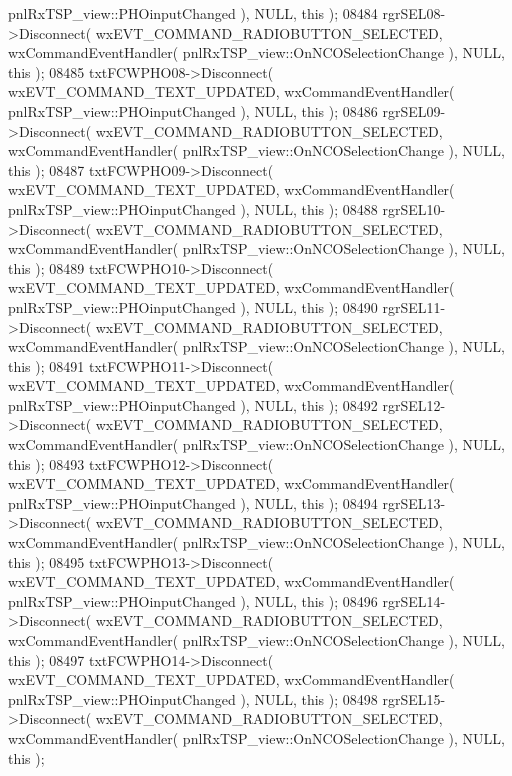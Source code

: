 \begin{DoxyCode}
      pnlRxTSP_view::PHOinputChanged ), NULL, \textcolor{keyword}{this} );
08484     rgrSEL08->Disconnect( wxEVT\_COMMAND\_RADIOBUTTON\_SELECTED, wxCommandEventHandler( 
      pnlRxTSP_view::OnNCOSelectionChange ), NULL, \textcolor{keyword}{this} );
08485     txtFCWPHO08->Disconnect( wxEVT\_COMMAND\_TEXT\_UPDATED, wxCommandEventHandler( 
      pnlRxTSP_view::PHOinputChanged ), NULL, \textcolor{keyword}{this} );
08486     rgrSEL09->Disconnect( wxEVT\_COMMAND\_RADIOBUTTON\_SELECTED, wxCommandEventHandler( 
      pnlRxTSP_view::OnNCOSelectionChange ), NULL, \textcolor{keyword}{this} );
08487     txtFCWPHO09->Disconnect( wxEVT\_COMMAND\_TEXT\_UPDATED, wxCommandEventHandler( 
      pnlRxTSP_view::PHOinputChanged ), NULL, \textcolor{keyword}{this} );
08488     rgrSEL10->Disconnect( wxEVT\_COMMAND\_RADIOBUTTON\_SELECTED, wxCommandEventHandler( 
      pnlRxTSP_view::OnNCOSelectionChange ), NULL, \textcolor{keyword}{this} );
08489     txtFCWPHO10->Disconnect( wxEVT\_COMMAND\_TEXT\_UPDATED, wxCommandEventHandler( 
      pnlRxTSP_view::PHOinputChanged ), NULL, \textcolor{keyword}{this} );
08490     rgrSEL11->Disconnect( wxEVT\_COMMAND\_RADIOBUTTON\_SELECTED, wxCommandEventHandler( 
      pnlRxTSP_view::OnNCOSelectionChange ), NULL, \textcolor{keyword}{this} );
08491     txtFCWPHO11->Disconnect( wxEVT\_COMMAND\_TEXT\_UPDATED, wxCommandEventHandler( 
      pnlRxTSP_view::PHOinputChanged ), NULL, \textcolor{keyword}{this} );
08492     rgrSEL12->Disconnect( wxEVT\_COMMAND\_RADIOBUTTON\_SELECTED, wxCommandEventHandler( 
      pnlRxTSP_view::OnNCOSelectionChange ), NULL, \textcolor{keyword}{this} );
08493     txtFCWPHO12->Disconnect( wxEVT\_COMMAND\_TEXT\_UPDATED, wxCommandEventHandler( 
      pnlRxTSP_view::PHOinputChanged ), NULL, \textcolor{keyword}{this} );
08494     rgrSEL13->Disconnect( wxEVT\_COMMAND\_RADIOBUTTON\_SELECTED, wxCommandEventHandler( 
      pnlRxTSP_view::OnNCOSelectionChange ), NULL, \textcolor{keyword}{this} );
08495     txtFCWPHO13->Disconnect( wxEVT\_COMMAND\_TEXT\_UPDATED, wxCommandEventHandler( 
      pnlRxTSP_view::PHOinputChanged ), NULL, \textcolor{keyword}{this} );
08496     rgrSEL14->Disconnect( wxEVT\_COMMAND\_RADIOBUTTON\_SELECTED, wxCommandEventHandler( 
      pnlRxTSP_view::OnNCOSelectionChange ), NULL, \textcolor{keyword}{this} );
08497     txtFCWPHO14->Disconnect( wxEVT\_COMMAND\_TEXT\_UPDATED, wxCommandEventHandler( 
      pnlRxTSP_view::PHOinputChanged ), NULL, \textcolor{keyword}{this} );
08498     rgrSEL15->Disconnect( wxEVT\_COMMAND\_RADIOBUTTON\_SELECTED, wxCommandEventHandler( 
      pnlRxTSP_view::OnNCOSelectionChange ), NULL, \textcolor{keyword}{this} );

\end{DoxyCode}

